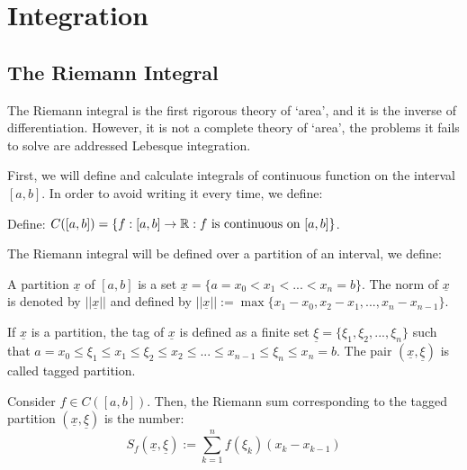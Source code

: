 \chapter{Integration}

\section{The Riemann Integral}

The Riemann integral is the first rigorous theory of `area', and it is the inverse of differentiation. However, it is not a complete theory of `area', the problems it fails to solve are addressed Lebesque integration.

First, we will define and calculate integrals of continuous function on the interval $[a,b]$. In order to avoid writing it every time, we define:

\begin{definition}
    Define: $C([a,b]) = \{f: [a,b] \to \mathbb{R}: f \text{ is continuous on } [a,b]\}$.
\end{definition}

The Riemann integral will be defined over a partition of an interval, we define:

\begin{definition}[Partition]
    A partition $\underline{x}$ of $[a,b]$ is a set $\underline{x} = \{a = x_0 < x_1 < ... < x_n = b \}$. The norm of $\underline{x}$ is denoted by $||\underline{x}||$ and defined by $||\underline{x}||:= \max \{x_1 - x_0, x_2 - x_1, ..., x_n - x_{n-1} \}$.
\end{definition}

\begin{definition}[Tag]
    If $\underline{x}$ is a partition, the tag of $\underline{x}$ is defined as a finite set $\underline{\xi} = \{ \xi_1, \xi_2, ..., \xi_n\}$ such that $a = x_0 \leq \xi_1 \leq x_1 \leq \xi_2 \leq x_2 \leq ... \leq x_{n-1} \leq \xi_n \leq x_n = b$. The pair $(\underline{x}, \underline{\xi})$ is called tagged partition.
\end{definition}

\begin{definition}
    Consider $f \in C([a,b])$. Then, the Riemann sum corresponding to the tagged partition $(\underline{x}, \underline{\xi})$ is the number:
    \begin{equation}
        S_f(\underline{x}, \underline{\xi}):= \sum \limits_{k=1}^n f(\xi_k)(x_k - x_{k-1})
    \end{equation}
\end{definition}


